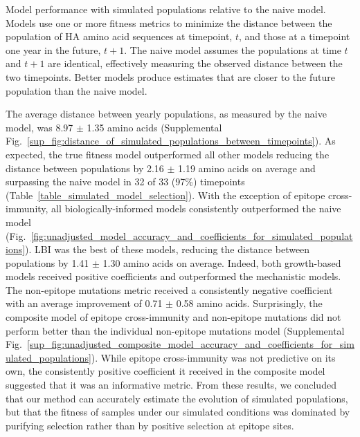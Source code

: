 \begin{table}[ht]
  \begin{center}
    
    \caption{
      Model performance with simulated populations relative to the naive model.
      Models use one or more fitness metrics to minimize the distance between the population of HA amino acid sequences at timepoint, $t$, and those at a timepoint one year in the future, $t + 1$.
      The naive model assumes the populations at time $t$ and $t + 1$ are identical, effectively measuring the observed distance between the two timepoints.
      Better models produce estimates that are closer to the future population than the naive model.
    }
    \label{table_simulated_model_selection}
  \end{center}
\end{table}

The average distance between yearly populations, as measured by the naive model, was 8.97 $\pm$ 1.35 amino acids (Supplemental Fig.~\ref{sup_fig:distance_of_simulated_populations_between_timepoints}).
As expected, the true fitness model outperformed all other models reducing the distance between populations by 2.16 $\pm$ 1.19 amino acids on average and surpassing the naive model in 32 of 33 (97\%) timepoints (Table~\ref{table_simulated_model_selection}).
With the exception of epitope cross-immunity, all biologically-informed models consistently outperformed the naive model (Fig.~\ref{fig:unadjusted_model_accuracy_and_coefficients_for_simulated_populations}).
LBI was the best of these models, reducing the distance between populations by 1.41 $\pm$ 1.30 amino acids on average.
Indeed, both growth-based models received positive coefficients and outperformed the mechanistic models.
The non-epitope mutations metric received a consistently negative coefficient with an average improvement of 0.71 $\pm$ 0.58 amino acids.
Surprisingly, the composite model of epitope cross-immunity and non-epitope mutations did not perform better than the individual non-epitope mutations model (Supplemental Fig.~\ref{sup_fig:unadjusted_composite_model_accuracy_and_coefficients_for_simulated_populations}).
While epitope cross-immunity was not predictive on its own, the consistently positive coefficient it received in the composite model suggested that it was an informative metric.
From these results, we concluded that our method can accurately estimate the evolution of simulated populations, but that the fitness of samples under our simulated conditions was dominated by purifying selection rather than by positive selection at epitope sites.

